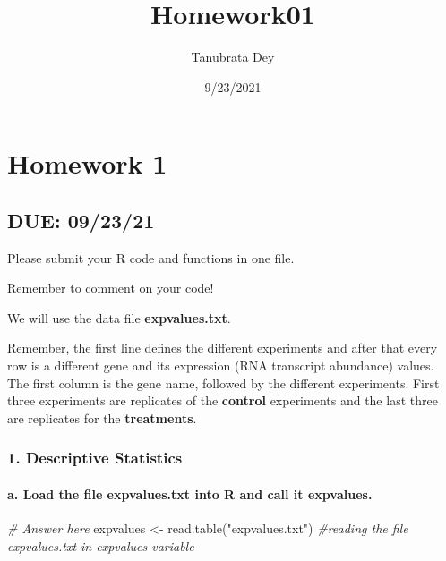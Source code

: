 \documentclass[
]{article}
\title{Homework01}
\author{Tanubrata Dey}
\date{9/23/2021}
\newenvironment{Shaded}{\begin{snugshade}}{\end{snugshade}}
\newcommand{\CommentTok}[1]{\textcolor[rgb]{0.56,0.35,0.01}{\textit{#1}}}
\newcommand{\FunctionTok}[1]{\textcolor[rgb]{0.00,0.00,0.00}{#1}}
\newcommand{\NormalTok}[1]{#1}
\newcommand{\OtherTok}[1]{\textcolor[rgb]{0.56,0.35,0.01}{#1}}
\newcommand{\StringTok}[1]{\textcolor[rgb]{0.31,0.60,0.02}{#1}}
\begin{document}
\maketitle

\hypertarget{homework-1}{%
\section{Homework 1}\label{homework-1}}

\hypertarget{due-092321}{%
\subsection{DUE: 09/23/21}\label{due-092321}}

Please submit your R code and functions in one file.

Remember to comment on your code!

We will use the data file \textbf{expvalues.txt}.

Remember, the first line defines the different experiments and after
that every row is a different gene and its expression (RNA transcript
abundance) values. The first column is the gene name, followed by the
different experiments. First three experiments are replicates of the
\textbf{control} experiments and the last three are replicates for the
\textbf{treatments}.

\hypertarget{descriptive-statistics}{%
\subsubsection{1. Descriptive Statistics}\label{descriptive-statistics}}

\hypertarget{a.-load-the-file-expvalues.txt-into-r-and-call-it-expvalues.}{%
\paragraph{\texorpdfstring{a. Load the file expvalues.txt into R and
call it
\textbf{expvalues}.}{a. Load the file expvalues.txt into R and call it expvalues.}}\label{a.-load-the-file-expvalues.txt-into-r-and-call-it-expvalues.}}

\begin{Shaded}
\begin{Highlighting}[]
\CommentTok{\# Answer here}
\NormalTok{expvalues }\OtherTok{\textless{}{-}} \FunctionTok{read.table}\NormalTok{(}\StringTok{"expvalues.txt"}\NormalTok{) }\CommentTok{\#reading the file expvalues.txt in expvalues variable}
\end{Highlighting}
\end{Shaded}
\end{document}
